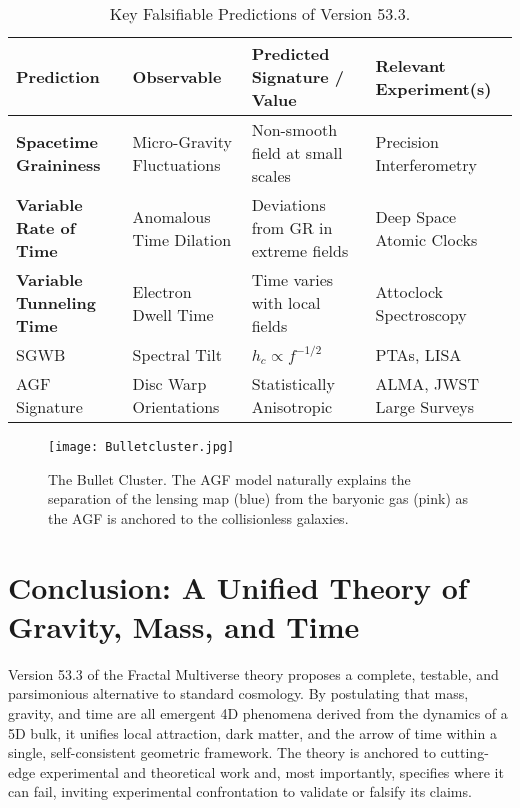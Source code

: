 \documentclass[aps,prd,onecolumn,10pt,superscriptaddress,nofootinbib,floatfix]{revtex4-2}
\begin{document}
\begin{table}[H]
  \centering
  \caption{Key Falsifiable Predictions of Version 53.3.}
  \begin{tabular}{llll}
    \toprule
    \textbf{\parbox[t]{3.5cm}{Prediction}} & \textbf{\parbox[t]{4cm}{Observable}} & \textbf{\parbox[t]{4.5cm}{Predicted Signature / Value}} & \textbf{\parbox[t]{4.5cm}{Relevant Experiment(s)}} \\
    \midrule
    \textbf{Spacetime Graininess} & \parbox[t]{4cm}{Micro-Gravity Fluctuations} & \parbox[t]{4.5cm}{Non-smooth field at small scales} & \parbox[t]{4.5cm}{Precision Interferometry} \\
    \textbf{Variable Rate of Time} & \parbox[t]{4cm}{Anomalous Time Dilation} & \parbox[t]{4.5cm}{Deviations from GR in extreme fields} & \parbox[t]{4.5cm}{Deep Space Atomic Clocks} \\
    \textbf{Variable Tunneling Time} & \parbox[t]{4cm}{Electron Dwell Time} & \parbox[t]{4.5cm}{Time varies with local fields} & \parbox[t]{4.5cm}{Attoclock Spectroscopy} \\
    SGWB & Spectral Tilt & $h_c \propto f^{-1/2}$ & PTAs, LISA \\
    AGF Signature & Disc Warp Orientations & Statistically Anisotropic & ALMA, JWST Large Surveys \\
    \bottomrule
  \end{tabular}
  \label{tab:falsifiers}
\end{table}

\begin{figure}[H]
  \centering
  \texttt{[image: Bulletcluster.jpg]}
  \caption{The Bullet Cluster. The AGF model naturally explains the separation of the lensing map (blue) from the baryonic gas (pink) as the AGF is anchored to the collisionless galaxies.}
  \label{fig:bullet_cluster}
\end{figure}

\section{Conclusion: A Unified Theory of Gravity, Mass, and Time}
Version 53.3 of the Fractal Multiverse theory proposes a complete, testable, and parsimonious alternative to standard cosmology. By postulating that mass, gravity, and time are all emergent 4D phenomena derived from the dynamics of a 5D bulk, it unifies local attraction, dark matter, and the arrow of time within a single, self-consistent geometric framework. The theory is anchored to cutting-edge experimental and theoretical work and, most importantly, specifies where it can fail, inviting experimental confrontation to validate or falsify its claims.
\end{document}
